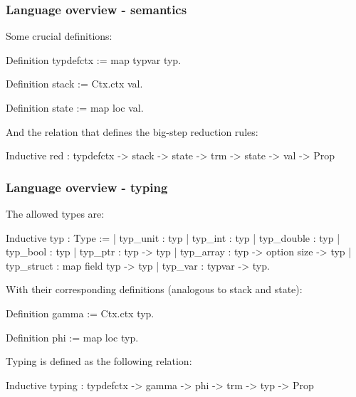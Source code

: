 \begin{frame}[fragile]
\frametitle{Language overview - semantics}

Some crucial definitions:

\begin{coqs}
  Definition typdefctx := map typvar typ.

  Definition stack := Ctx.ctx val.

  Definition state := map loc val.
\end{coqs}

\bigskip \pause

And the relation that defines the big-step reduction rules:

\begin{coqs}
  Inductive red : typdefctx -> stack -> state -> trm -> state -> val -> Prop
\end{coqs}


\end{frame}


\begin{frame}[fragile]
\frametitle{Language overview - typing}

The allowed types are:

\begin{coqs}
  Inductive typ : Type :=
    | typ_unit : typ
    | typ_int : typ
    | typ_double : typ
    | typ_bool : typ
    | typ_ptr : typ -> typ
    | typ_array : typ -> option size -> typ
    | typ_struct : map field typ -> typ
    | typ_var : typvar -> typ.
\end{coqs}

\bigskip \pause

With their corresponding definitions (analogous to stack and state):

\begin{coqs}
  Definition gamma := Ctx.ctx typ.

  Definition phi := map loc typ.
\end{coqs}

\bigskip \pause

Typing is defined as the following relation:

\begin{coqs}
  Inductive typing : typdefctx -> gamma -> phi -> trm -> typ -> Prop
\end{coqs}


\end{frame}



